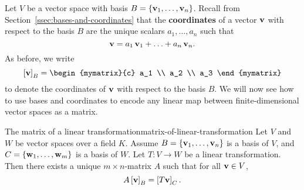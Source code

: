 Let $V$ be a vector space with basis
$B=\left\{\mbox{\bf v}_1,\ldots,\mbox{\bf v}_n\right\}$. Recall from
Section~\ref{ssec:bases-and-coordinates} that the \textbf{coordinates}
of a vector $\mbox{\bf v}$ with respect to the basis $B$%
%
 are the unique scalars
$a_1,\ldots,a_n$ such that
\begin{equation*}
  \mbox{\bf v} = a_1\,\mbox{\bf v}_1 + \ldots + a_n\,\mbox{\bf v}_n.
\end{equation*}
As before, we write
\begin{equation*}
  \coord{\vect{v}}_B = \begin{mymatrix}{c} a_1 \\ a_2 \\ a_3 \end{mymatrix}
\end{equation*}
to denote the coordinates of $\mbox{\bf v}$ with respect to the basis $B$.
We will now see how to use bases and coordinates to encode any linear
map between finite-dimensional vector spaces as a matrix. 

\begin{proposition}{The matrix of a linear transformation}{matrix-of-linear-transformation}
  Let $V$ and $W$ be vector spaces over a field $K$. Assume
  $B=\left\{\mbox{\bf v}_1,\ldots,\mbox{\bf v}_n\right\}$ is a basis of $V$, and
  $C=\left\{\mbox{\bf w}_1,\ldots,\mbox{\bf w}_m\right\}$ is a basis of $W$.
  Let $T:V\to W$ be a linear transformation. Then there exists a
  unique $m\times n$-matrix $A$ such that for all $\mbox{\bf v}\in V$,
  \begin{equation*}
    A\left[\mbox{\bf v}\right]_B = \left[T\mbox{\bf v}\right]_C.
  \end{equation*}
\end{proposition}

